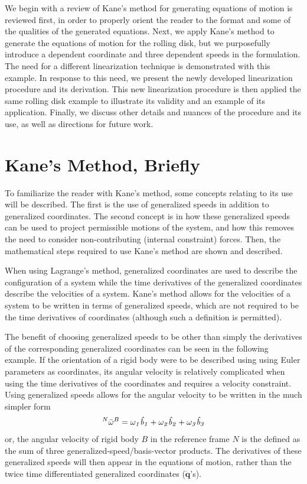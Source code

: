 \documentclass[smallcondensed,final]{svjour3}                     %
\begin{document}
We begin with a review of Kane's method for generating equations of motion is
reviewed first, in order to properly orient the reader to the format and some
of the qualities of the generated equations. Next, we apply Kane's method to
generate the equations of motion for the rolling disk, but we purposefully
introduce a dependent coordinate and three dependent speeds in the formulation.
The need for a different linearization technique is demonstrated with this
example. In response to this need, we present the newly developed linearization
procedure and its derivation.  This new linearization procedure is then applied
the same rolling disk example to illustrate its validity and an example of its
application.  Finally, we discuss other details and nuances of the procedure
and its use, as well as directions for future work.

\section{Kane's Method, Briefly}
\label{sec:kane_method}
To familiarize the reader with Kane's method, some concepts relating to its
use will be described.
The first is the use of generalized speeds in addition to generalized
coordinates.
The second concept is in how these generalized speeds can be used to project
permissible motions of the system, and how this removes the need to consider
non-contributing (internal constraint) forces.
Then, the mathematical steps required to use Kane's method are shown and
described.

When using Lagrange's method, generalized coordinates are used to describe the
configuration of a system while the time derivatives of the generalized
coordinates describe the velocities of a system.
Kane's method allows for the velocities of a system to be written in terms of
generalized speeds, which are not required to be the time derivatives of
coordinates (although such a definition is permitted).

The benefit of choosing generalized speeds to be other than simply the
derivatives of the corresponding generalized coordinates can be seen in the
following example.
If the orientation of a rigid body were to be described using using Euler
parameters as coordinates, its angular velocity is relatively complicated when
using the time derivatives of the coordinates and requires a velocity
constraint.
Using generalized speeds allows for the angular velocity to be written in the
much simpler form
\begin{align}
\label{eq:ex1}
{^N}\bar{\omega}^B = \it{\omega}_1 \hat{b}_1 + \it{\omega}_2 \hat{b}_2 +
\it{\omega}_3 \hat{b}_3
\end{align}
or, the angular velocity of rigid body $B$ in the reference frame $N$ is the
defined as the sum of three generalized-speed/basis-vector products.
The derivatives of these generalized speeds will then appear in the equations
of motion, rather than the twice time differentiated generalized coordinates
($\ddot{\mathbf{q}}$'s).
\end{document}
